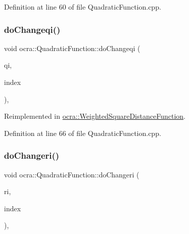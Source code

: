 Definition at line 60 of file Quadratic\+Function.\+cpp.

\hypertarget{classocra_1_1QuadraticFunction_abced87346b20e5ed323b966626487f16}{}\label{classocra_1_1QuadraticFunction_abced87346b20e5ed323b966626487f16} 
\subsubsection{\texorpdfstring{do\+Changeqi()}{doChangeqi()}}
{\footnotesize\ttfamily void ocra\+::\+Quadratic\+Function\+::do\+Changeqi (\begin{DoxyParamCaption}\item[{const Vector\+Xd \&}]{qi,  }\item[{int}]{index }\end{DoxyParamCaption})\hspace{0.3cm}{\ttfamily [protected]}, {\ttfamily [virtual]}}



Reimplemented in \hyperlink{classocra_1_1WeightedSquareDistanceFunction_a0ba9644814cf959e34ffc581a6b1e37a}{ocra\+::\+Weighted\+Square\+Distance\+Function}.



Definition at line 66 of file Quadratic\+Function.\+cpp.

\hypertarget{classocra_1_1QuadraticFunction_aeaeed88d4fef66c5db465f2887320e37}{}\label{classocra_1_1QuadraticFunction_aeaeed88d4fef66c5db465f2887320e37} 
\subsubsection{\texorpdfstring{do\+Changeri()}{doChangeri()}}
{\footnotesize\ttfamily void ocra\+::\+Quadratic\+Function\+::do\+Changeri (\begin{DoxyParamCaption}\item[{double}]{ri,  }\item[{int}]{index }\end{DoxyParamCaption})\hspace{0.3cm}{\ttfamily [protected]}, {\ttfamily [virtual]}}



